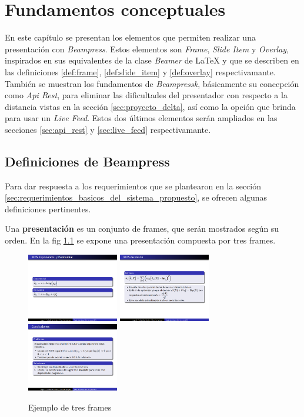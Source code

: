 
\chapter{Fundamentos conceptuales} %
\label{cha:fundamentos_conceptuales}
	En este capítulo se presentan los elementos que permiten realizar una presentación con \textit{Beampress}. Estos elementos son \textit{Frame}, \textit{Slide Item} y \textit{Overlay}, inspirados en sus equivalentes de la clase \textit{Beamer} de \LaTeX{} y que se describen en las definiciones \ref{def:frame}, \ref{def:slide_item} y \ref{def:overlay} respectivamante. También se muestran los fundamentos de \textit{Beampressk}, básicamente su concepción como \textit{Api Rest}, para eliminar las dificultades del presentador con respecto a la distancia vistas en la sección \ref{sec:proyecto_delta}, así como la opción que brinda para usar un \textit{Live Feed}. Estos dos últimos elementos serán ampliados en las secciones \ref{sec:api_rest} y \ref{sec:live_feed} respectivamante. 

	\section{Definiciones de Beampress} %
	\label{sec:definiciones_de_beampress}
		Para dar respuesta a los requerimientos que se plantearon en la sección \ref{sec:requerimientos_basicos_del_sistema_propuesto}, se ofrecen algunas definiciones pertinentes.
		
 		\begin{definition}
 		\label{def:presentation}
			Una \textbf{presentación} es un conjunto de frames, que serán mostrados según su orden. En la fig \ref{fig:frames} se expone una presentación compuesta por tres frames.
 		\end{definition}

 		\begin{figure}[tb]
 			\centering
 			\includegraphics[width=4cm]{img/f1}
 			\includegraphics[width=4cm]{img/f2}
 			\includegraphics[width=4cm]{img/f3}
 			\caption{Ejemplo de tres frames}
 			\label{fig:frames}
 		\end{figure}

